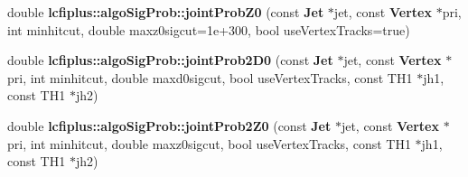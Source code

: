 \begin{DoxyCompactItemize}
double {\bf lcfiplus\-::algo\-Sig\-Prob\-::joint\-Prob\-Z0} (const {\bf Jet} $\ast$jet, const {\bf Vertex} $\ast$pri, int minhitcut, double maxz0sigcut=1e+300, bool use\-Vertex\-Tracks=true)
\item 
double {\bf lcfiplus\-::algo\-Sig\-Prob\-::joint\-Prob2\-D0} (const {\bf Jet} $\ast$jet, const {\bf Vertex} $\ast$pri, int minhitcut, double maxd0sigcut, bool use\-Vertex\-Tracks, const T\-H1 $\ast$jh1, const T\-H1 $\ast$jh2)
\item 
double {\bf lcfiplus\-::algo\-Sig\-Prob\-::joint\-Prob2\-Z0} (const {\bf Jet} $\ast$jet, const {\bf Vertex} $\ast$pri, int minhitcut, double maxz0sigcut, bool use\-Vertex\-Tracks, const T\-H1 $\ast$jh1, const T\-H1 $\ast$jh2)
\end{DoxyCompactItemize}
